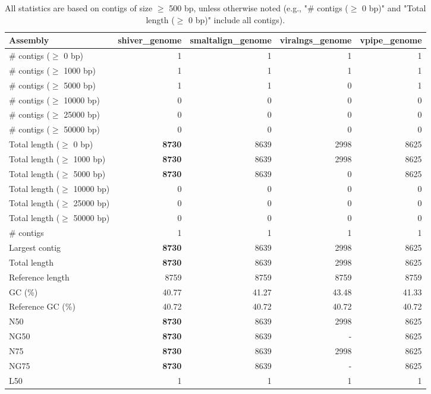 \documentclass[12pt,a4paper]{article}
\begin{document}
\begin{table}[ht]
\begin{center}
\caption{All statistics are based on contigs of size $\geq$ 500 bp, unless otherwise noted (e.g., "\# contigs ($\geq$ 0 bp)" and "Total length ($\geq$ 0 bp)" include all contigs).}
\begin{tabular}{|l*{4}{|r}|}
\hline
Assembly & shiver\_genome & smaltalign\_genome & viralngs\_genome & vpipe\_genome \\ \hline
\# contigs ($\geq$ 0 bp) & 1 & 1 & 1 & 1 \\ \hline
\# contigs ($\geq$ 1000 bp) & 1 & 1 & 1 & 1 \\ \hline
\# contigs ($\geq$ 5000 bp) & 1 & 1 & 0 & 1 \\ \hline
\# contigs ($\geq$ 10000 bp) & 0 & 0 & 0 & 0 \\ \hline
\# contigs ($\geq$ 25000 bp) & 0 & 0 & 0 & 0 \\ \hline
\# contigs ($\geq$ 50000 bp) & 0 & 0 & 0 & 0 \\ \hline
Total length ($\geq$ 0 bp) & {\bf 8730} & 8639 & 2998 & 8625 \\ \hline
Total length ($\geq$ 1000 bp) & {\bf 8730} & 8639 & 2998 & 8625 \\ \hline
Total length ($\geq$ 5000 bp) & {\bf 8730} & 8639 & 0 & 8625 \\ \hline
Total length ($\geq$ 10000 bp) & 0 & 0 & 0 & 0 \\ \hline
Total length ($\geq$ 25000 bp) & 0 & 0 & 0 & 0 \\ \hline
Total length ($\geq$ 50000 bp) & 0 & 0 & 0 & 0 \\ \hline
\# contigs & 1 & 1 & 1 & 1 \\ \hline
Largest contig & {\bf 8730} & 8639 & 2998 & 8625 \\ \hline
Total length & {\bf 8730} & 8639 & 2998 & 8625 \\ \hline
Reference length & 8759 & 8759 & 8759 & 8759 \\ \hline
GC (\%) & 40.77 & 41.27 & 43.48 & 41.33 \\ \hline
Reference GC (\%) & 40.72 & 40.72 & 40.72 & 40.72 \\ \hline
N50 & {\bf 8730} & 8639 & 2998 & 8625 \\ \hline
NG50 & {\bf 8730} & 8639 & - & 8625 \\ \hline
N75 & {\bf 8730} & 8639 & 2998 & 8625 \\ \hline
NG75 & {\bf 8730} & 8639 & - & 8625 \\ \hline
L50 & 1 & 1 & 1 & 1 \\ \hline

\end{tabular}
\end{center}
\end{table}
\end{document}
